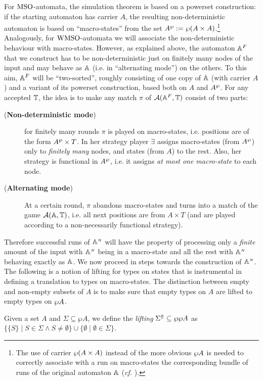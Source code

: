 For $\mathrm{MSO}$-automata, the simulation theorem is based on a powerset construction: if the starting automaton has carrier $A$, the resulting non-deterministic automaton is based on ``macro-states'' from the set $A^{\wp} := \wp (A \times A)$.\footnote{The use of carrier $\wp (A \times A)$ instead of the more obvious $\wp A$ is needed to correctly associate with a run on macro-states the corresponding bundle of runs of the original automaton $\mathbb{A}$ (\emph{cf.} \cite{Walukiewicz96}).} Analogously, for $\mathrm{WMSO}$-automata we will associate the non-deterministic behaviour with macro-states. However, as explained above, the automaton $\mathbb{A}^{F}$ that we construct has to be non-deterministic just on finitely many nodes of the input and may behave as $\mathbb{A}$ (i.e. in ``alternating mode'') on the others. To this aim, $\mathbb{A}^{F}$ will be ``two-sorted'', roughly consisting of one copy of $\mathbb{A}$ (with carrier $A$) and a variant of its powerset construction, based both on $A$ and $A^{\wp}$. For any accepted $\mathbb{T}$, the idea is to make any match $\pi$ of $\mathcal{A}(\mathbb{A}^{F},\mathbb{T})$ consist of two parts:
\begin{description}
  \item[(\textbf{Non-deterministic mode})] for finitely many rounds $\pi$ is played on macro-states, i.e. positions are of the form $A^{\wp} \times T$. In her strategy player $\exists$ assigns macro-states (from $A^{\wp}$) only to \emph{finitely many} nodes, and states (from $A$) to the rest. Also, her strategy is functional in $A^{\wp}$, i.e. it assigns \emph{at most one macro-state} to each node.
  \item[(\textbf{Alternating mode})] At a certain round, $\pi$ abandons macro-states and turns into a match of the game $\mathcal{A}(\mathbb{A},\mathbb{T})$, i.e. all next positions are from $A \times T$ (and are played according to a non-necessarily functional strategy). %
\end{description}
Therefore successful runs of $\mathbb{A}^{{\scriptscriptstyle N}}$ will have the property of processing only a \emph{finite} amount of the input with $\mathbb{A}^{{\scriptscriptstyle N}}$ being in a macro-state and all the rest with $\mathbb{A}^{{\scriptscriptstyle N}}$ behaving exactly as $\mathbb{A}$. We now proceed in steps towards the construction of $\mathbb{A}^{{\scriptscriptstyle N}}$. The following is a notion of lifting for types on states that is instrumental in defining a translation to types on macro-states. The distinction between empty and non-empty subsets of $A$ is to make sure that empty types on $A$ are lifted to empty types on $\wp A$.
\begin{definition}
Given a set $A$ and $\Sigma \subseteq \wp A$, we define the \emph{lifting} $\Sigma^{\Uparrow} \subseteq \wp \wp A$ as $\{\{S\} \mid S \in \Sigma \wedge S \neq \emptyset\} \cup
    \{\emptyset \mid \emptyset \in \Sigma \}$.
\end{definition}

